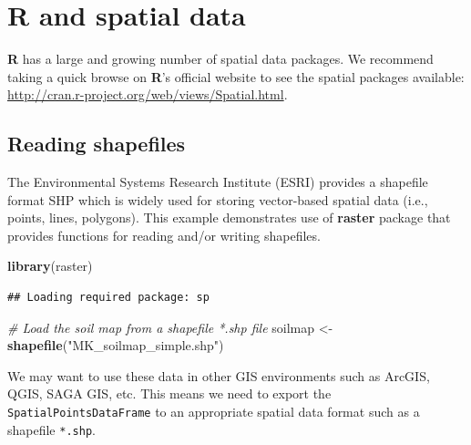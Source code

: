\documentclass[10pt,b5paper,]{book}
\newenvironment{Shaded}{\begin{snugshade}}{\end{snugshade}}
\newcommand{\CommentTok}[1]{\textcolor[rgb]{0.56,0.35,0.01}{\textit{#1}}}
\newcommand{\DataTypeTok}[1]{\textcolor[rgb]{0.13,0.29,0.53}{#1}}
\newcommand{\KeywordTok}[1]{\textcolor[rgb]{0.13,0.29,0.53}{\textbf{#1}}}
\newcommand{\NormalTok}[1]{#1}
\newcommand{\OperatorTok}[1]{\textcolor[rgb]{0.81,0.36,0.00}{\textbf{#1}}}
\newcommand{\OtherTok}[1]{\textcolor[rgb]{0.56,0.35,0.01}{#1}}
\newcommand{\StringTok}[1]{\textcolor[rgb]{0.31,0.60,0.02}{#1}}
\theoremstyle{definition}
\theoremstyle{definition}
\theoremstyle{definition}
\theoremstyle{remark}
\begin{document}
\hypertarget{r-and-spatial-data}{%
\section{R and spatial data}\label{r-and-spatial-data}}

\textbf{R} has a large and growing number of spatial data packages. We
recommend taking a quick browse on \textbf{R}'s official website to see
the spatial packages available:
\url{http://cran.r-project.org/web/views/Spatial.html}.

\hypertarget{reading-shapefiles}{%
\subsection{Reading shapefiles}\label{reading-shapefiles}}

The Environmental Systems Research Institute (ESRI) provides a shapefile
format SHP which is widely used for storing vector-based spatial data
(i.e., points, lines, polygons). This example demonstrates use of
\textbf{raster} package that provides functions for reading and/or
writing shapefiles.

\begin{Shaded}
\begin{Highlighting}[]
\KeywordTok{library}\NormalTok{(raster)}
\end{Highlighting}
\end{Shaded}

\begin{verbatim}
## Loading required package: sp
\end{verbatim}

\begin{Shaded}
\begin{Highlighting}[]
\CommentTok{# Load the soil map from a shapefile *.shp file}
\NormalTok{soilmap <-}\StringTok{ }\KeywordTok{shapefile}\NormalTok{(}\StringTok{"MK_soilmap_simple.shp"}\NormalTok{)}
\end{Highlighting}
\end{Shaded}

We may want to use these data in other GIS environments such as ArcGIS,
QGIS, SAGA GIS, etc. This means we need to export the
\texttt{SpatialPointsDataFrame} to an appropriate spatial data format
such as a shapefile \texttt{*.shp}.

\begin{Shaded}
\end{Shaded}
\end{document}

